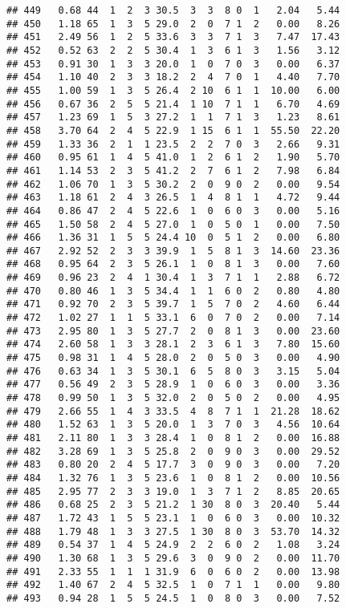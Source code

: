 \documentclass[
]{article}
\begin{document}
\begin{verbatim}
## 449   0.68 44  1  2  3 30.5  3  3  8 0  1   2.04   5.44
## 450   1.18 65  1  3  5 29.0  2  0  7 1  2   0.00   8.26
## 451   2.49 56  1  2  5 33.6  3  3  7 1  3   7.47  17.43
## 452   0.52 63  2  2  5 30.4  1  3  6 1  3   1.56   3.12
## 453   0.91 30  1  3  3 20.0  1  0  7 0  3   0.00   6.37
## 454   1.10 40  2  3  3 18.2  2  4  7 0  1   4.40   7.70
## 455   1.00 59  1  3  5 26.4  2 10  6 1  1  10.00   6.00
## 456   0.67 36  2  5  5 21.4  1 10  7 1  1   6.70   4.69
## 457   1.23 69  1  5  3 27.2  1  1  7 1  3   1.23   8.61
## 458   3.70 64  2  4  5 22.9  1 15  6 1  1  55.50  22.20
## 459   1.33 36  2  1  1 23.5  2  2  7 0  3   2.66   9.31
## 460   0.95 61  1  4  5 41.0  1  2  6 1  2   1.90   5.70
## 461   1.14 53  2  3  5 41.2  2  7  6 1  2   7.98   6.84
## 462   1.06 70  1  3  5 30.2  2  0  9 0  2   0.00   9.54
## 463   1.18 61  2  4  3 26.5  1  4  8 1  1   4.72   9.44
## 464   0.86 47  2  4  5 22.6  1  0  6 0  3   0.00   5.16
## 465   1.50 58  2  4  5 27.0  1  0  5 0  1   0.00   7.50
## 466   1.36 31  1  5  5 24.4 10  0  5 1  2   0.00   6.80
## 467   2.92 52  2  3  3 39.9  1  5  8 1  3  14.60  23.36
## 468   0.95 64  2  3  5 26.1  1  0  8 1  3   0.00   7.60
## 469   0.96 23  2  4  1 30.4  1  3  7 1  1   2.88   6.72
## 470   0.80 46  1  3  5 34.4  1  1  6 0  2   0.80   4.80
## 471   0.92 70  2  3  5 39.7  1  5  7 0  2   4.60   6.44
## 472   1.02 27  1  1  5 33.1  6  0  7 0  2   0.00   7.14
## 473   2.95 80  1  3  5 27.7  2  0  8 1  3   0.00  23.60
## 474   2.60 58  1  3  3 28.1  2  3  6 1  3   7.80  15.60
## 475   0.98 31  1  4  5 28.0  2  0  5 0  3   0.00   4.90
## 476   0.63 34  1  3  5 30.1  6  5  8 0  3   3.15   5.04
## 477   0.56 49  2  3  5 28.9  1  0  6 0  3   0.00   3.36
## 478   0.99 50  1  3  5 32.0  2  0  5 0  2   0.00   4.95
## 479   2.66 55  1  4  3 33.5  4  8  7 1  1  21.28  18.62
## 480   1.52 63  1  3  5 20.0  1  3  7 0  3   4.56  10.64
## 481   2.11 80  1  3  3 28.4  1  0  8 1  2   0.00  16.88
## 482   3.28 69  1  3  5 25.8  2  0  9 0  3   0.00  29.52
## 483   0.80 20  2  4  5 17.7  3  0  9 0  3   0.00   7.20
## 484   1.32 76  1  3  5 23.6  1  0  8 1  2   0.00  10.56
## 485   2.95 77  2  3  3 19.0  1  3  7 1  2   8.85  20.65
## 486   0.68 25  2  3  5 21.2  1 30  8 0  3  20.40   5.44
## 487   1.72 43  1  5  5 23.1  1  0  6 0  3   0.00  10.32
## 488   1.79 48  1  3  3 27.5  1 30  8 0  3  53.70  14.32
## 489   0.54 37  1  4  5 24.9  2  2  6 0  2   1.08   3.24
## 490   1.30 68  1  3  5 29.6  3  0  9 0  2   0.00  11.70
## 491   2.33 55  1  1  1 31.9  6  0  6 0  2   0.00  13.98
## 492   1.40 67  2  4  5 32.5  1  0  7 1  1   0.00   9.80
## 493   0.94 28  1  5  5 24.5  1  0  8 0  3   0.00   7.52

\end{verbatim}
\end{document}
